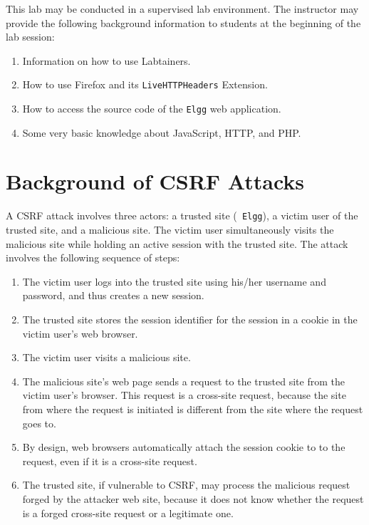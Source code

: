 This lab may be conducted in a
supervised lab environment. The instructor may provide the following
background information to students at the beginning of the lab session:
\begin{enumerate}
  \item Information on how to use Labtainers.
  \item How to use Firefox and its {\tt LiveHTTPHeaders} Extension.
  \item How to access the source code of the {\tt Elgg} web application. 
  \item Some very basic knowledge about JavaScript, HTTP, and PHP.
       
\end{enumerate}

\section{Background of CSRF Attacks}

A CSRF attack involves three actors: a trusted site ({\tt
Elgg}), a victim user of the trusted site, and a malicious site. 
The victim user simultaneously visits the
malicious site while holding an active session with the trusted site.
The attack involves the following sequence of steps:
\begin{enumerate}
  \item The victim user logs into the trusted site using his/her
    username and password, and thus creates a new session.

  \item The trusted site stores the session identifier for the session
    in a cookie in the victim user's web browser. 

  \item The victim user visits a malicious site.

  \item The malicious site's web page sends a
    request to the trusted site from the victim user's browser. This
    request is a cross-site request, because the site from where the request is
    initiated is different from the site where the request goes to.

  \item By design, web browsers automatically attach the session cookie to
    to the request, even if it is a cross-site request. 

  \item The trusted site, if vulnerable to CSRF, may process the malicious 
    request forged by the attacker web site, because it does not know
    whether the request is a forged cross-site request or a legitimate one.
\end{enumerate}


